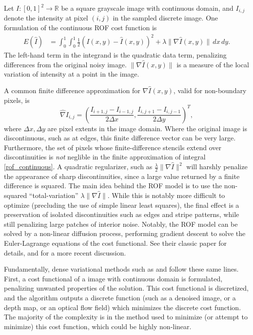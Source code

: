 \documentclass[conference]{IEEEtran}
\begin{document}
Let $I:[0,1]^2 \rightarrow \mathbb{R}$ be a square grayscale image with continuous domain, and
$I_{i,j}$ denote the intensity at pixel $(i, j)$ in the sampled discrete image.
One formulation of the continuous ROF cost function is
\begin{equation}\label{rof_continuous}
\begin{split}
    E(\hat{I}) &= \int_0^1\int_0^1 \frac{1}{2} \left(I(x,y) - \hat{I}(x,y)\right)^2 + \lambda \|\nabla \hat{I}(x,y)\| \,dx \,dy.
\end{split}
\end{equation}
The left-hand term in the integrand is the quadratic data term, penalizing differences from the original noisy image.
$\|\nabla \hat{I}(x,y)\|$ is a measure of the local variation of intensity at a point in the image.

A common finite difference approximation for $\nabla\hat{I}(x,y)$, valid for non-boundary pixels, is
\begin{equation}
    \hat{\nabla}I_{i,j} = \left(\frac{I_{i+1,j} - I_{i-1,j}}{2\Delta x}, \frac{I_{i,j+1} - I_{i,j-1}}{2\Delta y}\right)^T,
\end{equation}
where $\Delta x, \Delta y$ are pixel extents in the image domain. Where the original image is discontinuous, such as at edges,
this finite difference vector can be very large. Furthermore, the set of pixels whose finite-difference stencils extend over discontinuities is
\textit{not} neglible in the finite approximation of integral \eqref{rof_continuous}. A quadratic regularizer, such as
$\frac{\lambda}{2} \|\nabla \hat{I}\|^2$ will harshly penalize the appearance of sharp discontinuities, since a large value returned
by a finite difference is squared. The main idea behind the ROF model is to use the non-squared ``total-variation'' $\lambda \|\nabla \hat{I}\|$.
While this is notably more difficult to optimize (precluding the use of simple linear least squares), the final effect is a preservation
of isolated discontinuities such as edges and stripe patterns, while still penalizing large patches of interior noise. Notably, the ROF model can be solved by a non-linear diffusion process, performing gradient descent to solve the Euler-Lagrange
equations of the cost functional. See their classic paper \cite{rof} for details, and \cite{cremers_rof} for a more recent discussion.

Fundamentally, dense variational methods such as \cite{horn_schunck} and \cite{dense_geometry} follow these same lines. First,
a cost functional of a image with continuous domain is formulated, penalizing unwanted properties of the solution. This cost functional is discretized,
and the algorithm outputs a discrete function (such as a denoised image, or a depth map, or an optical flow field) which minimizes the discrete cost function.
The majority of the complexity is in the method used to minimize (or attempt to minimize) this cost function, which could be highly non-linear.
\end{document}
